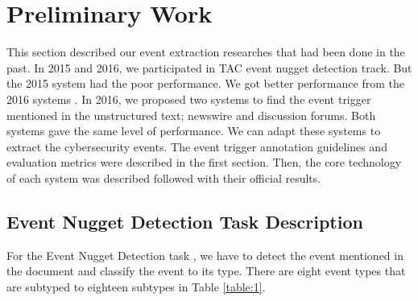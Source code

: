 \chapter{Preliminary Work}
\thispagestyle{plain}

\label{Chapter4}

This section described our event extraction researches that had been done in the past. In 2015 and 2016, we participated in TAC event nugget detection track. But the 2015 system \cite{satyapanich2015event} had the poor performance. We got better performance from the 2016 systems \cite{satyapanich2016event}. In 2016, we proposed two systems to find the event trigger mentioned in the unstructured text; newswire and discussion forums. Both systems gave the same level of performance. We can adapt these systems to extract the cybersecurity events. The event trigger annotation guidelines and evaluation metrics were described in the first section. Then, the core technology of each system was described followed with their official results.


\section{Event Nugget Detection Task Description}
\label{eventnugget}

For the Event Nugget Detection task \cite{mitamura2016}, we have to detect the event mentioned in the document and classify the event to its type. There are eight event types that are subtyped to eighteen subtypes in Table \ref{table:1}.


